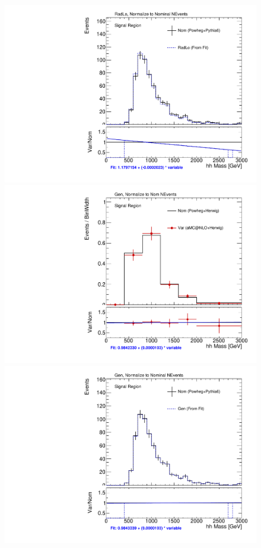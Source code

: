 \begin{figure}[!htbp]
\begin{center}
\includegraphics[scale=0.33]{./figures/boosted/systematics/ttbar_fromfit_hhMass_SR_RadLo}  \\
\includegraphics[scale=0.33]{./figures/boosted/systematics/ttbar_alt_hhMass_SR_Gen_rebin}  
\includegraphics[scale=0.33]{./figures/boosted/systematics/ttbar_fromfit_hhMass_SR_Gen}     \\

\end{center}
\end{figure}
